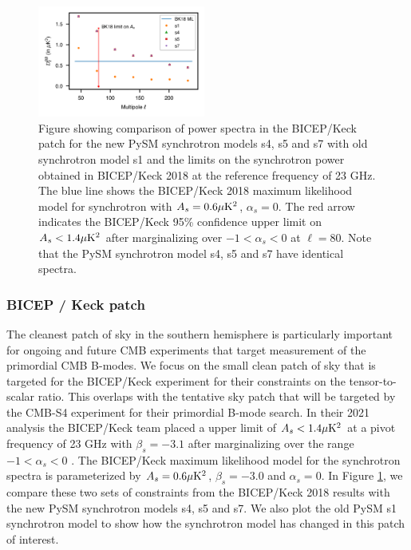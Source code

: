 \documentclass[twocolumn]{aastex631}
\begin{document}
\begin{figure}
    \centering
    \includegraphics[width=0.49\textwidth]{figures/Dlcomp_PySM3-4b8_BKpatch.png}
    \caption{Figure showing comparison of power spectra in the BICEP/Keck patch for the new PySM synchrotron models s4, s5 and s7 with old synchrotron model s1 and the limits on the synchrotron power obtained in BICEP/Keck 2018 \citep{Ade:2021} at the reference frequency of 23 GHz. The blue line shows the BICEP/Keck 2018 maximum likelihood model for synchrotron with $A_s=0.6 \mu {\rm K}^2$, $\alpha_s=0$. The red arrow indicates the BICEP/Keck 95\% confidence upper limit on $A_s<1.4 \mu {\rm K}^2$ after marginalizing over $-1<\alpha_s<0$ at $\ell=80$. Note that the PySM synchrotron model s4, s5 and s7 have identical spectra.}
    \label{fig:Dl_sync_BK}
\end{figure}

\subsubsection{BICEP / Keck patch}
The cleanest patch of sky in the southern hemisphere is particularly important for ongoing and future CMB experiments that target measurement of the primordial CMB B-modes. We focus on the small clean patch of sky that is targeted for the BICEP/Keck experiment for their constraints on the tensor-to-scalar ratio. This overlaps with the tentative sky patch that will be targeted by the CMB-S4 experiment for their primordial B-mode search. In their 2021 analysis the BICEP/Keck team placed a upper limit of $A_s<1.4 \mu{\rm K}^2$ at a pivot frequency of 23 GHz with $\beta_s=-3.1$ after marginalizing over the range $-1<\alpha_s<0$ \citep{Ade:2021}. The BICEP/Keck maximum likelihood model for the synchrotron spectra is parameterized by $A_s=0.6 \mu{\rm K}^2$, $\beta_s=-3.0$ and $\alpha_s=0$. In Figure \ref{fig:Dl_sync_BK}, we compare  these two sets of constraints from the BICEP/Keck 2018 results with the new PySM synchrotron models s4, s5 and s7. We also plot the old PySM s1 synchrotron model to show how the synchrotron model has changed in this patch of interest.
\end{document}
